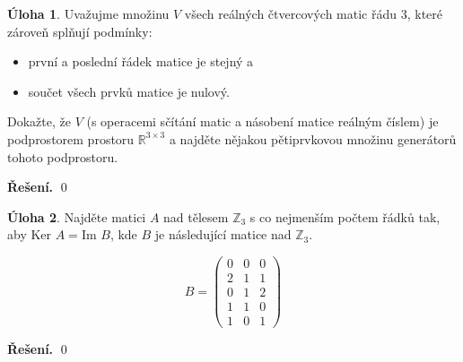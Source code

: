 \documentclass{article}
\theoremstyle{definition}
\newtheorem{uloha}{Úloha}
\theoremstyle{plain}
\newenvironment{reseni}{\noindent\textbf{Řešení.}\hspace{0.5em}}{\hfill\qed\medskip}
\begin{document}
\begin{uloha}
Uvažujme množinu $V$ všech reálných čtvercových matic řádu 3, které zároveň splňují podmínky:
\begin{itemize}
    \item první a poslední řádek matice je stejný a
    \item součet všech prvků matice je nulový.
\end{itemize}
Dokažte, že $V$ (s operacemi sčítání matic a násobení matice reálným číslem) je podprostorem prostoru $\mathbb{R}^{3 \times 3}$ a najděte nějakou pětiprvkovou množinu generátorů tohoto podprostoru.
\end{uloha}
\begin{reseni}
\end{reseni}
\begin{uloha}
Najděte matici $A$ nad tělesem $\mathbb{Z}_3$ s co nejmenším počtem řádků tak, aby $\text{Ker } A = \text{Im } B$, kde $B$ je následující matice nad $\mathbb{Z}_3$.

\[
B = \begin{pmatrix}
0 & 0 & 0 \\
2 & 1 & 1 \\
0 & 1 & 2 \\
1 & 1 & 0 \\
1 & 0 & 1
\end{pmatrix}
\]
\end{uloha}
\begin{reseni}
\end{reseni}
\end{document}
